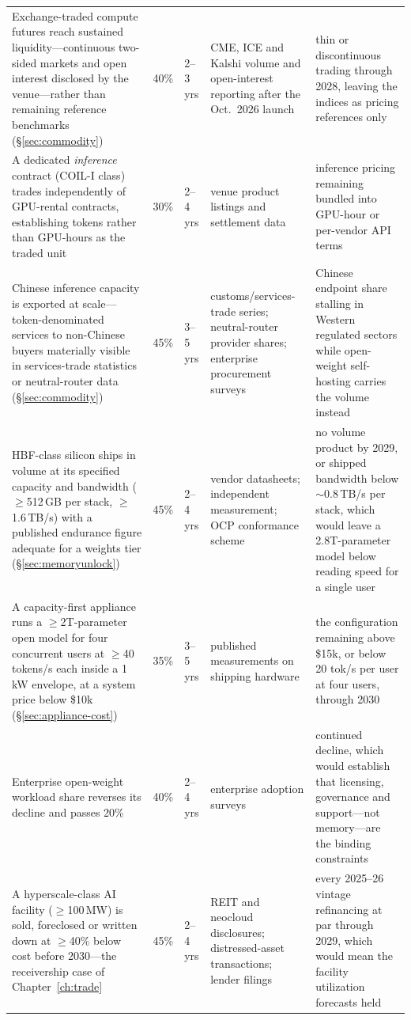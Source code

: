 \begin{small}
\begin{longtable}{p{42mm}p{16mm}p{13mm}p{31mm}p{31mm}}
    \addlinespace
    Exchange-traded compute futures reach sustained liquidity---continuous two-sided markets and open interest disclosed by the venue---rather than remaining reference benchmarks (\S\ref{sec:commodity}) & 40\% & 2--3 yrs & CME, ICE and Kalshi volume and open-interest reporting after the Oct.\ 2026 launch & thin or discontinuous trading through 2028, leaving the indices as pricing references only \\
    \addlinespace
    A dedicated \emph{inference} contract (COIL-I class) trades independently of GPU-rental contracts, establishing tokens rather than GPU-hours as the traded unit & 30\% & 2--4 yrs & venue product listings and settlement data & inference pricing remaining bundled into GPU-hour or per-vendor API terms \\
    \addlinespace
    Chinese inference capacity is exported at scale---token-denominated services to non-Chinese buyers materially visible in services-trade statistics or neutral-router data (\S\ref{sec:commodity}) & 45\% & 3--5 yrs & customs/services-trade series; neutral-router provider shares; enterprise procurement surveys & Chinese endpoint share stalling in Western regulated sectors while open-weight self-hosting carries the volume instead \\
    \addlinespace
    HBF-class silicon ships in volume at its specified capacity and bandwidth ($\geq$512\,GB per stack, $\geq$1.6\,TB/s) with a published endurance figure adequate for a weights tier (\S\ref{sec:memoryunlock}) & 45\% & 2--4 yrs & vendor datasheets; independent measurement; OCP conformance scheme & no volume product by 2029, or shipped bandwidth below $\sim$0.8\,TB/s per stack, which would leave a 2.8T-parameter model below reading speed for a single user \\
    \addlinespace
    A capacity-first appliance runs a $\geq$2T-parameter open model for four concurrent users at $\geq$40 tokens/s each inside a 1\,kW envelope, at a system price below \$10k (\S\ref{sec:appliance-cost}) & 35\% & 3--5 yrs & published measurements on shipping hardware & the configuration remaining above \$15k, or below 20 tok/s per user at four users, through 2030 \\
    \addlinespace
    Enterprise open-weight workload share reverses its decline and passes 20\% & 40\% & 2--4 yrs & enterprise adoption surveys & continued decline, which would establish that licensing, governance and support---not memory---are the binding constraints \\
    \addlinespace
    A hyperscale-class AI facility ($\geq$100\,MW) is sold, foreclosed or written down at $\geq$40\% below cost before 2030---the receivership case of Chapter~\ref{ch:trade} & 45\% & 2--4 yrs & REIT and neocloud disclosures; distressed-asset transactions; lender filings & every 2025--26 vintage refinancing at par through 2029, which would mean the facility utilization forecasts held \\

\end{longtable}
\end{small}
